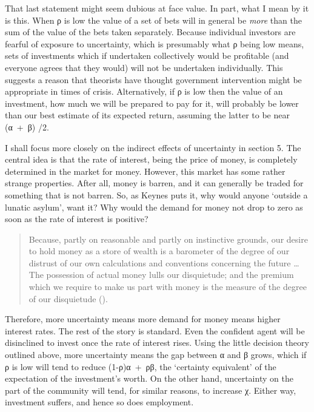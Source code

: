 \documentclass[
  10pt,
  letterpaper,
  DIV=11,
  numbers=noendperiod,
  twoside]{scrartcl}
\begin{document}
That last statement might seem dubious at face value. In part, what I
mean by it is this. When ρ is low the value of a set of bets will in
general be \emph{more} than the sum of the value of the bets taken
separately. Because individual investors are fearful of exposure to
uncertainty, which is presumably what ρ being low means, sets of
investments which if undertaken collectively would be profitable (and
everyone agrees that they would) will not be undertaken individually.
This suggests a reason that theorists have thought government
intervention might be appropriate in times of crisis. Alternatively, if
ρ is low then the value of an investment, how much we will be prepared
to pay for it, will probably be lower than our best estimate of its
expected return, assuming the latter to be near (α~+~β) /2.

I shall focus more closely on the indirect effects of uncertainty in
section 5. The central idea is that the rate of interest, being the
price of money, is completely determined in the market for money.
However, this market has some rather strange properties. After all,
money is barren, and it can generally be traded for something that is
not barren. So, as Keynes puts it, why would anyone `outside a lunatic
asylum', want it? Why would the demand for money not drop to zero as
soon as the rate of interest is positive?

\begin{quote}
Because, partly on reasonable and partly on instinctive grounds, our
desire to hold money as a store of wealth is a barometer of the degree
of our distrust of our own calculations and conventions concerning the
future \ldots{} The possession of actual money lulls our disquietude;
and the premium which we require to make us part with money is the
measure of the degree of our disquietude
().
\end{quote}

Therefore, more uncertainty means more demand for money means higher
interest rates. The rest of the story is standard. Even the confident
agent will be disinclined to invest once the rate of interest rises.
Using the little decision theory outlined above, more uncertainty means
the gap between α and β grows, which if ρ is low will tend to reduce
(1-ρ)α~+~ρβ, the `certainty equivalent' of the expectation of the
investment's worth. On the other hand, uncertainty on the part of the
community will tend, for similar reasons, to increase χ. Either way,
investment suffers, and hence so does employment.
\end{document}
